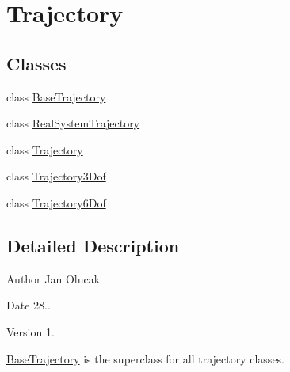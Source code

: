 \hypertarget{group___trajectory}{}\section{Trajectory}
\label{group___trajectory}
\subsection*{Classes}
\begin{DoxyCompactItemize}
\item 
class \hyperlink{class_base_trajectory}{Base\+Trajectory}
\item 
class \hyperlink{class_real_system_trajectory}{Real\+System\+Trajectory}
\item 
class \hyperlink{class_trajectory}{Trajectory}
\item 
class \hyperlink{class_trajectory3_dof}{Trajectory3\+Dof}
\item 
class \hyperlink{class_trajectory6_dof}{Trajectory6\+Dof}
\end{DoxyCompactItemize}


\subsection{Detailed Description}
\begin{DoxyAuthor}{Author}
Jan Olucak 
\end{DoxyAuthor}
\begin{DoxyDate}{Date}
28.. 
\end{DoxyDate}
\begin{DoxyVersion}{Version}
1.
\end{DoxyVersion}
\hyperlink{class_base_trajectory}{Base\+Trajectory} is the superclass for all trajectory classes. 